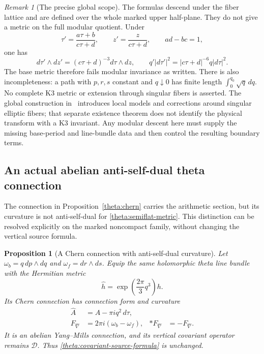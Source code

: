 \documentclass[11pt]{article}
\numberwithin{equation}{section}
\newtheorem{proposition}[theorem]{Proposition}
\theoremstyle{definition}
\theoremstyle{remark}
\newtheorem{remark}[theorem]{Remark}
\begin{document}
\begin{remark}[The precise global scope]
\label{theta:global-scope}
The formulas descend under the fiber lattice and are defined over the
whole marked upper half-plane.  They do not give a metric on the full
modular quotient.  Under
\[
 \tau'=\frac{a\tau+b}{c\tau+d},\qquad z'=\frac z{c\tau+d},
 \qquad ad-bc=1,
\]
one has
\begin{equation}
 d\tau'\wedge dz'=(c\tau+d)^{-3}d\tau\wedge dz,
 \qquad q'|d\tau'|^2=|c\tau+d|^{-6}q|d\tau|^2.
 \label{theta:modular-obstruction}
\end{equation}
The base metric therefore fails modular invariance as written.
There is also incompleteness: a path with $p,r,s$ constant and
$q\downarrow0$ has finite length $\int_0^{q_0}\sqrt q\,dq$.
No complete K3 metric or extension through singular fibers is asserted.
The global construction in~\cite{GrossWilson2000} introduces local
models and corrections around singular elliptic fibers; that separate
existence theorem does not identify the physical transform with a K3
invariant.  Any modular descent here must supply the missing base-period
and line-bundle data and then control the resulting boundary terms.
\end{remark}

\subsection{An actual abelian anti-self-dual theta connection}
\label{theta:ASD}

The connection in Proposition~\ref{theta:chern} carries the arithmetic
section, but its curvature is not anti-self-dual for
\eqref{theta:semiflat-metric}.  This distinction can be resolved explicitly
on the marked noncompact family, without changing the vertical source
formula.

\begin{proposition}[A Chern connection with anti-self-dual curvature]
\label{theta:ASD-connection}
Let $\omega_b=q\,dp\wedge dq$ and $\omega_f=dr\wedge ds$.
Equip the same holomorphic theta line bundle with the Hermitian metric
\begin{equation}
 \widehat h=\exp\!\left(\frac{2\pi}{3}q^3\right)h.
 \label{theta:ASD-metric}
\end{equation}
Its Chern connection has connection form and curvature
\begin{align}
 \widehat A&=A-\pi i q^2\,d\tau,
                       \label{theta:ASD-form}\\
 F_{\widehat\nabla}
    &=2\pi i(\omega_b-\omega_f),
 & *F_{\widehat\nabla}&=-F_{\widehat\nabla}.
                       \label{theta:ASD-curvature}
\end{align}
It is an abelian Yang--Mills connection, and its vertical covariant
operator remains $\mathcal D$.  Thus
\eqref{theta:covariant-source-formula} is unchanged.
\end{proposition}
\end{document}
